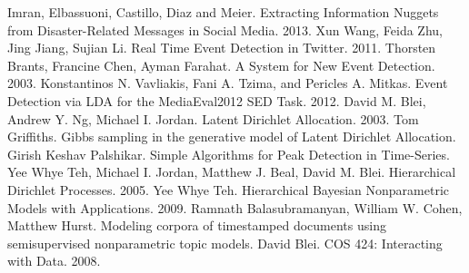 \documentclass[12pt, a4paper]{article}
\begin{document}
  
\begin{thebibliography}{9}
	Imran, Elbassuoni, Castillo, Diaz and Meier.
	Extracting Information Nuggets from Disaster-Related Messages in Social Media.
	2013.
	Xun Wang, Feida Zhu, Jing Jiang, Sujian Li.
	Real Time Event Detection in Twitter.
	2011.
	Thorsten Brants, Francine Chen, Ayman Farahat.
	A System for New Event Detection.
	2003.
	Konstantinos N. Vavliakis, Fani A. Tzima, and Pericles A. Mitkas.	
	Event Detection via LDA for the MediaEval2012 SED Task.
	2012.
	David M. Blei, Andrew Y. Ng, Michael I. Jordan.
	Latent Dirichlet Allocation.
	2003.
	Tom Griffiths.
	Gibbs sampling in the generative model of Latent Dirichlet Allocation.
	Girish Keshav Palshikar.
	Simple Algorithms for Peak Detection in Time-Series.
	Yee Whye Teh, Michael I. Jordan, Matthew J. Beal, David M. Blei.
	Hierarchical Dirichlet Processes.
	2005.
	Yee Whye Teh.
	Hierarchical Bayesian Nonparametric Models with Applications.
	2009.
	Ramnath Balasubramanyan, William W. Cohen, Matthew Hurst.
	Modeling corpora of timestamped documents using semisupervised nonparametric topic models.
	 David Blei.
	 COS 424: Interacting with Data.
	 2008.
\end{thebibliography}
  
\end{document}
